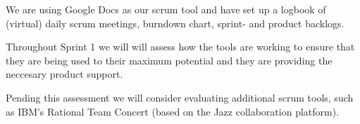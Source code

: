 \documentclass[a4paper,11pt]{article}
\begin{document}
We are using Google Docs as our scrum tool and have set up a logbook of (virtual) daily scrum meetings, burndown chart, sprint- and product backlogs.

Throughout Sprint 1 we will will assess how the tools are working to ensure that they are being used to their maximum potential and they are providing the neccesary product support.

Pending this assessment we will consider evaluating additional scrum tools, such as IBM's Rational Team Concert (based on the Jazz collaboration platform).


\end{document}
